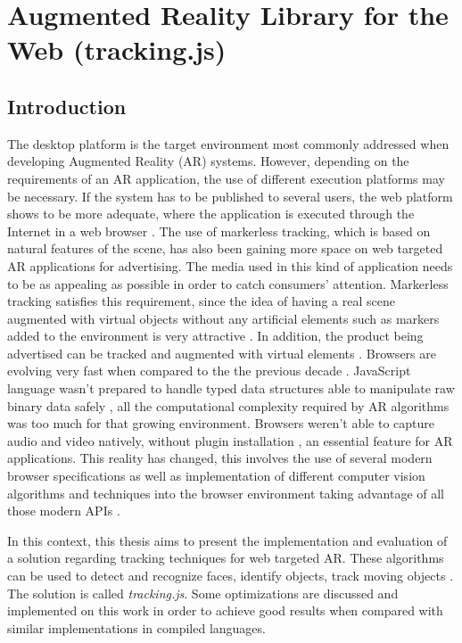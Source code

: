\chapter{Augmented Reality Library for the Web (tracking.js)} %
\label{cha:ar_library_for_the_web}

\section{Introduction} %
\label{sec:ar_library_for_the_web:introduction}

The desktop platform is the target environment most commonly addressed when developing Augmented Reality (AR) systems. However, depending on the requirements of an AR application, the use of different execution platforms may be necessary. If the system has to be published to several users, the web platform shows to be more adequate, where the application is executed through the Internet in a web browser \cite{Pablo2013}.
The use of markerless tracking, which is based on natural features of the scene, has also been gaining more space on web targeted AR applications for advertising. The media used in this kind of application needs to be as appealing as possible in order to catch consumers’ attention. Markerless tracking satisfies this requirement, since the idea of having a real scene augmented with virtual objects without any artificial elements such as markers added to the environment is very attractive \cite{Pablo2013}. In addition, the product being advertised can be tracked and augmented with virtual elements \cite{Pablo2013}.
Browsers are evolving very fast when compared to the the previous decade \cite{Hickson2013}. JavaScript language \cite{International2009,MDN2013} wasn't prepared to handle typed data structures \cite{TypedArray2013} able to manipulate raw binary data safely \cite{Canvas2013}, all the computational complexity required by AR algorithms was too much for that growing environment. Browsers weren't able to capture audio and video \cite{MediaCapture2013,WebRTC2013} natively, without plugin installation \cite{Flash2013}, an essential feature for AR applications. This reality has changed, this involves the use of several modern browser specifications \cite{Hickson2013,WC2006} as well as implementation of different computer vision algorithms and techniques into the browser environment taking advantage of all those modern APIs \cite{Hickson2013,WC2006}.

In this context, this thesis aims to present the implementation and evaluation of a solution regarding tracking techniques for web targeted AR. These algorithms can be used to detect and recognize faces, identify objects, track moving objects \etc. The solution is called \textit{tracking.js}. Some optimizations are discussed and implemented on this work in order to achieve good results when compared with similar implementations in compiled languages.

